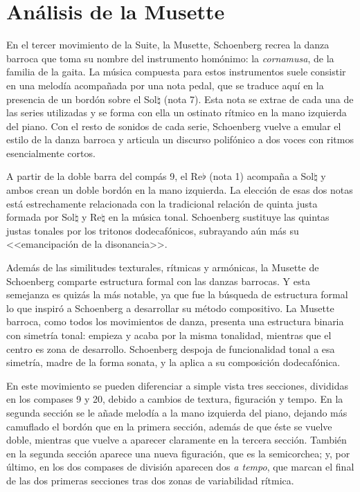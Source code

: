 	\section{Análisis de la Musette}
	\label{musette}
		En el tercer movimiento de la Suite, la Musette, Schoenberg recrea la danza barroca que toma su nombre del instrumento homónimo: la \emph{cornamusa}, de la familia de la gaita. La música compuesta para estos instrumentos suele consistir en una melodía acompañada por una nota pedal, que se traduce aquí en la presencia de un bordón sobre el Sol$\natural$ (nota 7). Esta nota se extrae de cada una de las series utilizadas y se forma con ella un ostinato rítmico en la mano izquierda del piano. Con el resto de sonidos de cada serie, Schoenberg vuelve a emular el estilo de la danza barroca y articula un discurso polifónico a dos voces con ritmos esencialmente cortos.
		
		A partir de la doble barra del compás 9, el Re$\flat$ (nota 1) acompaña a Sol$\natural$ y ambos crean un doble bordón en la mano izquierda. La elección de esas dos notas está estrechamente relacionada con la tradicional relación de quinta justa formada por Sol$\natural$ y Re$\natural$ en la música tonal. Schoenberg sustituye las quintas justas tonales por los tritonos dodecafónicos, subrayando aún más su <<emancipación de la disonancia>>.
		
		Además de las similitudes texturales, rítmicas y armónicas, la Musette de Schoenberg comparte estructura formal con las danzas barrocas. Y esta semejanza es quizás la más notable, ya que fue la búsqueda de estructura formal lo que inspiró a Schoenberg a desarrollar su método compositivo. La Musette barroca, como todos los movimientos de danza, presenta una estructura binaria con simetría tonal: empieza y acaba por la misma tonalidad, mientras que el centro es zona de desarrollo. Schoenberg despoja de funcionalidad tonal a esa simetría, madre de la forma sonata, y la aplica a su composición dodecafónica.
		
		En este movimiento se pueden diferenciar a simple vista tres secciones, divididas en los compases 9 y 20, debido a cambios de textura, figuración y tempo. En la segunda sección se le añade melodía a la mano izquierda del piano, dejando más camuflado el bordón que en la primera sección, además de que éste se vuelve doble, mientras que vuelve a aparecer claramente en la tercera sección. También en la segunda sección aparece una nueva figuración, que es la semicorchea; y, por último, en los dos compases de división aparecen dos \emph{a tempo}, que marcan el final de las dos primeras secciones tras dos zonas de variabilidad rítmica. \cite{clercq}
		
